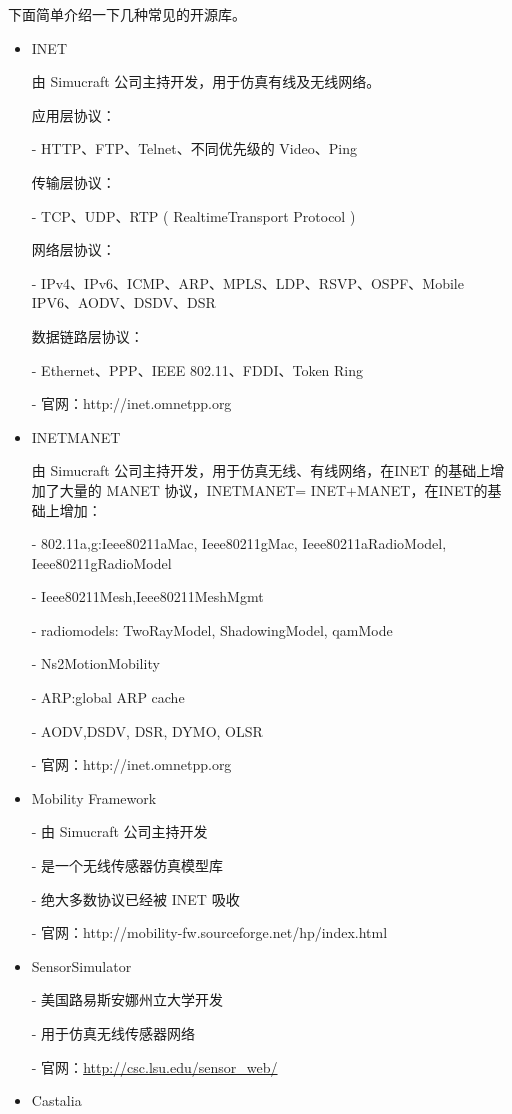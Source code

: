 下面简单介绍一下几种常见的开源库。


\begin{itemize}
\item INET

由 Simucraft 公司主持开发，用于仿真有线及无线网络。

应用层协议：

- HTTP、FTP、Telnet、不同优先级的 Video、Ping

传输层协议：

- TCP、UDP、RTP ( RealtimeTransport Protocol )

网络层协议：

- IPv4、IPv6、ICMP、ARP、MPLS、LDP、RSVP、OSPF、Mobile IPV6、AODV、DSDV、DSR

数据链路层协议：

- Ethernet、PPP、IEEE 802.11、FDDI、Token Ring

- 官网：http://inet.omnetpp.org

\item INETMANET

由 Simucraft 公司主持开发，用于仿真无线、有线网络，在INET 的基础上增加了大量的 MANET 协议，INETMANET= INET+MANET，在INET的基础上增加：

- 802.11a,g:Ieee80211aMac, Ieee80211gMac, Ieee80211aRadioModel, Ieee80211gRadioModel

- Ieee80211Mesh,Ieee80211MeshMgmt

- radiomodels: TwoRayModel, ShadowingModel, qamMode

- Ns2MotionMobility

- ARP:global ARP cache

- AODV,DSDV, DSR, DYMO, OLSR

- 官网：http://inet.omnetpp.org

\item Mobility Framework

- 由 Simucraft 公司主持开发

- 是一个无线传感器仿真模型库

- 绝大多数协议已经被 INET 吸收

- 官网：http://mobility-fw.sourceforge.net/hp/index.html

\item SensorSimulator

- 美国路易斯安娜州立大学开发

- 用于仿真无线传感器网络

- 官网：\url{http://csc.lsu.edu/sensor_web/}

\item Castalia


\end{itemize}
